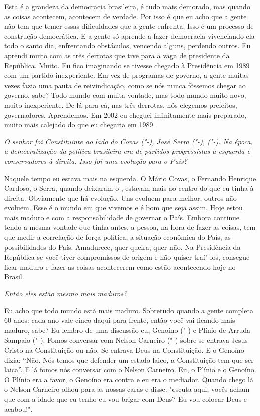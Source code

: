 Esta é a grandeza da democracia brasileira, é tudo mais demorado, mas
quando as coisas acontecem, acontecem de verdade. Por isso é que eu acho
que a gente não tem que temer essas dificuldades que a gente enfrenta.
Isso é um processo de construção democrática. E a gente só aprende a
fazer democracia vivenciando ela todo o santo dia, enfrentando
obstáculos, vencendo alguns, perdendo outros. Eu aprendi muito com as
três derrotas que tive para a vaga de presidente da República. Muito. Eu
fico imaginando se tivesse chegado à Presidência em 1989 com um partido
inexperiente. Em vez de programas de governo, a gente muitas vezes fazia
uma pauta de reivindicação, como se nós nunca fôssemos chegar ao
governo, sabe? Todo mundo com muita vontade, mas todo mundo muito novo,
muito inexperiente. De lá para cá, nas três derrotas, nós elegemos
prefeitos, governadores. Aprendemos. Em 2002 eu cheguei infinitamente
mais preparado, muito mais calejado do que eu chegaria em 1989.

\medskip

\emph{O senhor foi Constituinte ao lado do Covas ("-), José Serra
("-),  ("-). Na época, a democratização da política
brasileira era de partidos progressistas à esquerda e conservadores à
direita. Isso foi uma evolução para o País?}

Naquele tempo eu estava mais na esquerda. O Mário Covas,
o Fernando Henrique Cardoso, o Serra, quando deixaram o , estavam
mais ao centro do que eu tinha à direita. Obviamente que há evolução.
Uns evoluem para melhor, outros não evoluem. Esse é o mundo em que
vivemos e é bom que seja assim. Hoje estou mais maduro e com a
responsabilidade de governar o País. Embora continue tendo a mesma
vontade que tinha antes, a pessoa, na hora de fazer as coisas, tem que
medir a correlação de força política, a situação econômica do País, as
possibilidades do País. Amadurece, quer queira, quer não. Na Presidência
da República se você tiver compromissos de origem e não quiser traí"-los,
consegue ficar maduro e fazer as coisas acontecerem como estão
acontecendo hoje no Brasil.

\medskip

\emph{Então eles estão mesmo mais maduros?}

Eu acho que todo mundo está mais maduro. Sobretudo quando
a gente completa 60 anos: cada ano vale cinco daqui para frente, então
você vai ficando mais maduro, sabe? Eu lembro de uma discussão eu,
Genoíno ("-) e Plínio de Arruda Sampaio ("-). Fomos conversar com
Nelson Carneiro ("-) sobre se entrava Jesus Cristo na Constituição
ou não. Se entrava Deus na Constituição. E o Genoíno dizia: ``Não. Nós
temos que defender um estado laico, a Constituição tem que ser laica''.
E lá fomos nós conversar com o Nelson Carneiro. Eu, o Plínio e o
Genoíno. O Plínio era a favor, o Genoíno era contra e eu era o mediador.
Quando chego lá o Nelson Carneiro olhou para as nossas caras e disse:
"escuta aqui, vocês acham que com a idade que eu tenho eu vou brigar com
Deus? Eu vou colocar Deus e acabou!".

